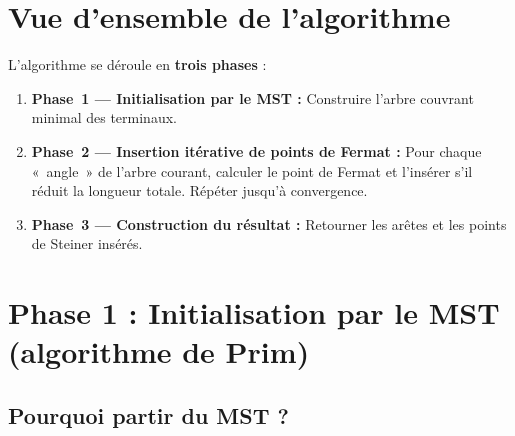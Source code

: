 \documentclass[12pt,a4paper]{article}
\begin{document}
\section{Vue d'ensemble de l'algorithme}

L'algorithme se déroule en \textbf{trois phases} :

\begin{enumerate}
  \item \textbf{Phase~1 — Initialisation par le MST :}
        Construire l'arbre couvrant minimal des terminaux.
  \item \textbf{Phase~2 — Insertion itérative de points de Fermat :}
        Pour chaque «~angle~» de l'arbre courant, calculer le point de Fermat
        et l'insérer s'il réduit la longueur totale.
        Répéter jusqu'à convergence.
  \item \textbf{Phase~3 — Construction du résultat :}
        Retourner les arêtes et les points de Steiner insérés.
\end{enumerate}

\begin{center}
\end{center}

\section{Phase 1 : Initialisation par le MST (algorithme de Prim)}

\subsection{Pourquoi partir du MST ?}
\end{document}
